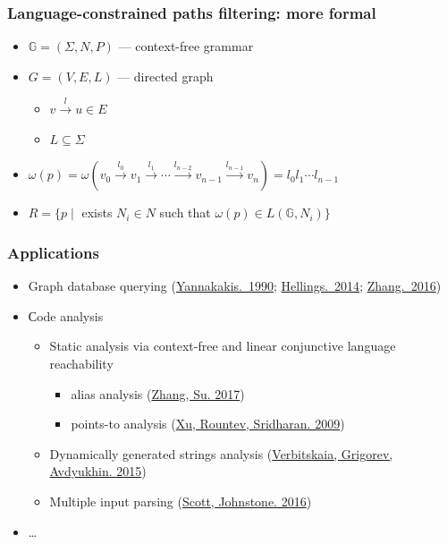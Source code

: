 \documentclass[xcolor=table]{beamer}
\begin{document}
\begin{frame}[fragile]
  \transwipe[direction=90]
  \frametitle{Language-constrained paths filtering: more formal}
  \begin{itemize}
    \item $\mathbb{G} = (\Sigma, N, P)$ --- context-free grammar
    \item $G = (V,E,L)$ --- directed graph
      \begin{itemize} 
        \item $v \xrightarrow{l} u \in E$
        \item $L\subseteq \Sigma$
      \end{itemize}
    \item $\omega(p) = \omega(v_0 \xrightarrow{l_0} v_1 \xrightarrow{l_1} \cdots \xrightarrow{l_{n-2}} v_{n-1} \xrightarrow{l_{n-1}} v_n) = l_0 l_1 \cdots l_{n-1}$
    \item $R = \{ p \mid $ exists $ N_i \in N $ such that $ \omega(p) \in L(\mathbb{G},N_i)\}$
  \end{itemize}
\end{frame}

\begin{frame}[fragile]
  \transwipe[direction=90]
  \frametitle{Applications}
  \begin{itemize}
    \item Graph database querying (\href{http://dl.acm.org/citation.cfm?id=298576}{Yannakakis.~1990}; \href{https://uhdspace.uhasselt.be/dspace/handle/1942/16709}{Hellings.~2014}; \href{https://link.springer.com/chapter/10.1007/978-3-319-46523-4_38}{Zhang.~2016})
    \item Сode analysis
    \begin{itemize}
      \item Static analysis via context-free and linear conjunctive language reachability
        \begin{itemize}
          \item alias analysis (\href{https://dl.acm.org/citation.cfm?id=3009848}{Zhang, Su. 2017})
          \item points-to analysis (\href{https://link.springer.com/chapter/10.1007/978-3-642-03013-0_6}{Xu, Rountev, Sridharan. 2009})
        \end{itemize}
      \item Dynamically generated strings analysis (\href{https://link.springer.com/chapter/10.1007/978-3-319-41579-6\_22}{Verbitskaia, Grigorev, Avdyukhin. 2015})
      \item Multiple input parsing (\href{https://2016.splashcon.org/event/parsing2016-multiple-input-gll-parsing}{Scott, Johnstone. 2016})
    \end{itemize}
    \item \dots
  \end{itemize}
\end{frame}
\end{document}
